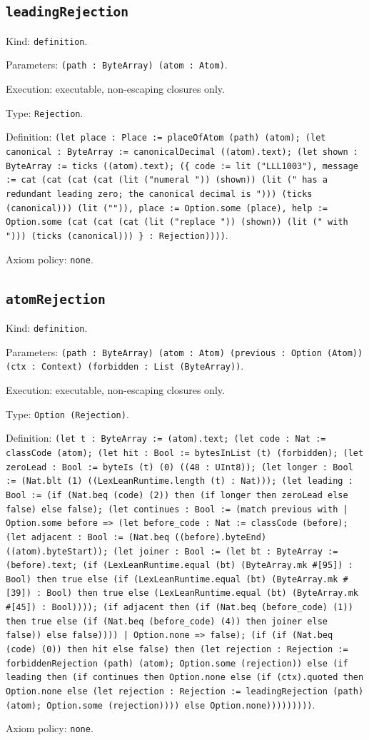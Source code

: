 \documentclass[11pt]{article}
\begin{document}
\subsection*{\texttt{leadingRejection}}
\noindent Kind: \texttt{definition}.\par
\noindent Parameters: \texttt{(path : ByteArray) (atom : Atom)}.\par
\noindent Execution: executable, non-escaping closures only.\par
\noindent Type: \texttt{Rejection}.\par
\noindent Definition: \texttt{(let place : Place := placeOfAtom (path) (atom); (let canonical : ByteArray := canonicalDecimal ((atom).text); (let shown : ByteArray := ticks ((atom).text); (\{ code := lit ("LLL1003"), message := cat (cat (cat (cat (lit ("numeral ")) (shown)) (lit (" has a redundant leading zero; the canonical decimal is "))) (ticks (canonical))) (lit ("")), place := Option.some (place), help := Option.some (cat (cat (cat (lit ("replace ")) (shown)) (lit (" with "))) (ticks (canonical))) \} : Rejection))))}.\par
\noindent Axiom policy: \texttt{none}.\par
\subsection*{\texttt{atomRejection}}
\noindent Kind: \texttt{definition}.\par
\noindent Parameters: \texttt{(path : ByteArray) (atom : Atom) (previous : Option (Atom)) (ctx : Context) (forbidden : List (ByteArray))}.\par
\noindent Execution: executable, non-escaping closures only.\par
\noindent Type: \texttt{Option (Rejection)}.\par
\noindent Definition: \texttt{(let t : ByteArray := (atom).text; (let code : Nat := classCode (atom); (let hit : Bool := bytesInList (t) (forbidden); (let zeroLead : Bool := byteIs (t) (0) ((48 : UInt8)); (let longer : Bool := (Nat.blt (1) ((LexLeanRuntime.length (t) : Nat))); (let leading : Bool := (if (Nat.beq (code) (2)) then (if longer then zeroLead else false) else false); (let continues : Bool := (match previous with | Option.some before => (let before\_code : Nat := classCode (before); (let adjacent : Bool := (Nat.beq ((before).byteEnd) ((atom).byteStart)); (let joiner : Bool := (let bt : ByteArray := (before).text; (if (LexLeanRuntime.equal (bt) (ByteArray.mk \#[95]) : Bool) then true else (if (LexLeanRuntime.equal (bt) (ByteArray.mk \#[39]) : Bool) then true else (LexLeanRuntime.equal (bt) (ByteArray.mk \#[45]) : Bool)))); (if adjacent then (if (Nat.beq (before\_code) (1)) then true else (if (Nat.beq (before\_code) (4)) then joiner else false)) else false)))) | Option.none => false); (if (if (Nat.beq (code) (0)) then hit else false) then (let rejection : Rejection := forbiddenRejection (path) (atom); Option.some (rejection)) else (if leading then (if continues then Option.none else (if (ctx).quoted then Option.none else (let rejection : Rejection := leadingRejection (path) (atom); Option.some (rejection)))) else Option.none)))))))))}.\par
\noindent Axiom policy: \texttt{none}.\par
\end{document}
